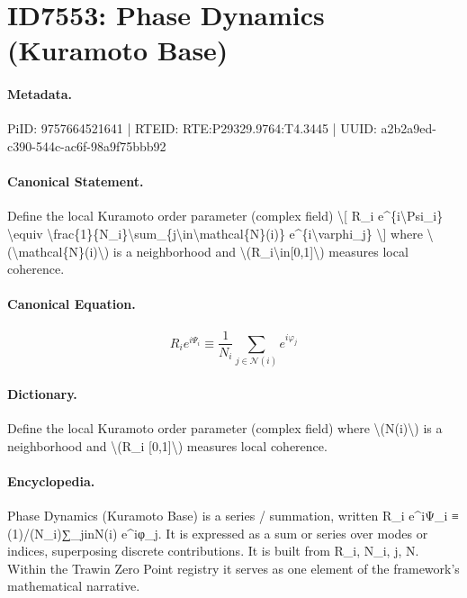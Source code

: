 \section*{ID7553: Phase Dynamics (Kuramoto Base)}
\paragraph{Metadata.}
PiID: 9757664521641 | RTEID: RTE:P29329.9764:T4.3445 | UUID: a2b2a9ed-c390-544c-ac6f-98a9f75bbb92

\paragraph{Canonical Statement.}
Define the local Kuramoto order parameter (complex field) \textbackslash{}[ R\_i e\textasciicircum{}\{i\textbackslash{}Psi\_i\} \textbackslash{}equiv \textbackslash{}frac\{1\}\{N\_i\}\textbackslash{}sum\_\{j\textbackslash{}in\textbackslash{}mathcal\{N\}(i)\} e\textasciicircum{}\{i\textbackslash{}varphi\_j\} \textbackslash{}] where \textbackslash{}(\textbackslash{}mathcal\{N\}(i)\textbackslash{}) is a neighborhood and \textbackslash{}(R\_i\textbackslash{}in[0,1]\textbackslash{}) measures local coherence.

\paragraph{Canonical Equation.}
\[
R_i e^{i\Psi_i} \equiv \frac{1}{N_i}\sum_{j\in\mathcal{N}(i)} e^{i\varphi_j}
\]

\paragraph{Dictionary.}
Define the local Kuramoto order parameter (complex field) where \textbackslash{}(N(i)\textbackslash{}) is a neighborhood and \textbackslash{}(R\_i [0,1]\textbackslash{}) measures local coherence.

\paragraph{Encyclopedia.}
Phase Dynamics (Kuramoto Base) is a series / summation, written R\_i e\textasciicircum{}iΨ\_i ≡ (1)/(N\_i)∑\_jinN(i) e\textasciicircum{}iφ\_j. It is expressed as a sum or series over modes or indices, superposing discrete contributions. It is built from R\_i, N\_i, j, N. Within the Trawin Zero Point registry it serves as one element of the framework's mathematical narrative.
